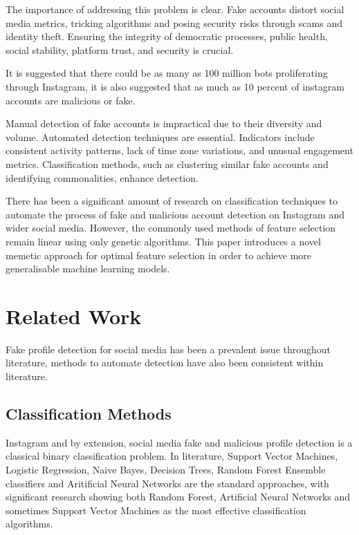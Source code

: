 \documentclass[conference]{IEEEtran}
\begin{document}
The importance of addressing this problem is clear. Fake accounts distort social media metrics, tricking algorithms and posing security risks through scams and identity theft. Ensuring the integrity of democratic processes, public health, social stability, platform trust, and security is crucial.

It is suggested that there could be as many as 100 million bots proliferating through Instagram, it is also suggested that as much as 10 percent of instagram accounts are malicious or fake\cite{Williams2018}.

Manual detection of fake accounts is impractical due to their diversity and volume. Automated detection techniques are essential. Indicators include consistent activity patterns, lack of time zone variations, and unusual engagement metrics. Classification methods, such as clustering similar fake accounts and identifying commonalities, enhance detection.

There has been a significant amount of research on classification techniques to automate the process of fake and malicious account detection on Instagram and wider social media\cite{EkosputraEtAl2021,EzarfelixEtAl2022}. However, the commonly used methods of feature selection remain linear using only genetic algorithms. This paper introduces a novel memetic approach for optimal feature selection in order to achieve more generalisable machine learning models.

\section{Related Work}\label{sec:related-work}

Fake profile detection for social media has been a prevalent issue throughout literature, methods to automate detection have also been consistent within literature.

\subsection{Classification Methods}

Instagram and by extension, social media fake and malicious profile detection is a classical binary classification problem. In literature, Support Vector Machines, Logistic Regression, Naive Bayes, Decision Trees, Random Forest Ensemble classifiers and Aritificial Neural Networks are the standard approaches, with significant research showing both Random Forest, Artificial Neural Networks and sometimes Support Vector Machines as the most effective classification algorithms\cite{AkyonKalfaoglu2019,EkosputraEtAl2021}.
\end{document}
